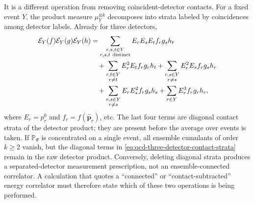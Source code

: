 It is a different operation from removing coincident-detector contacts.  For
a fixed event \(Y\), the product measure \(\mu_Y^{\otimes k}\) decomposes
into strata labeled by coincidences among detector labels.  Already for three
detectors,
\begin{equation}
\begin{aligned}
  \mathcal E_Y(f)\mathcal E_Y(g)\mathcal E_Y(h)
  &=
  \sum_{\substack{r,s,t\in Y\\ r,s,t\ {\rm distinct}}}
    E_rE_sE_t f_r g_s h_t                                      \\
  &\quad+
  \sum_{\substack{r,t\in Y\\ r\neq t}}
    E_r^2E_t f_r g_r h_t
  +
  \sum_{\substack{r,s\in Y\\ r\neq s}}
    E_r^2E_s f_r g_s h_r                                      \\
  &\quad+
  \sum_{\substack{r,s\in Y\\ r\neq s}}
    E_rE_s^2 f_r g_s h_s
  +
  \sum_{r\in Y}E_r^3 f_r g_r h_r ,
\end{aligned}
\label{eq:qcd-three-detector-contact-strata}
\end{equation}
where \(E_r=p_r^0\) and \(f_r=f(\widehat{\mathbf p}_r)\), etc.  The last
four terms are diagonal contact strata of the detector product; they are
present before the average over events is taken.  If
\(\mathbb P_\Psi\) is concentrated on a single event, all ensemble cumulants
of order \(k\geq2\) vanish, but the diagonal terms in
\eqref{eq:qcd-three-detector-contact-strata} remain in the raw detector
product.  Conversely, deleting diagonal strata produces a separated-detector
measurement prescription, not an ensemble-connected correlator.  A calculation
that quotes a ``connected'' or ``contact-subtracted'' energy correlator must
therefore state which of these two operations is being performed.

